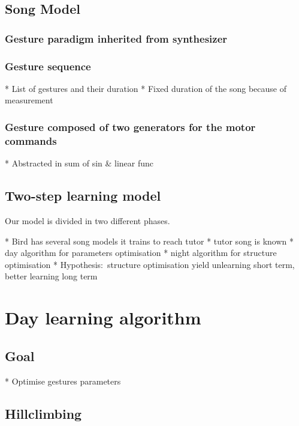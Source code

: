 \documentclass{report}
\begin{document}
\subsection{Song Model}\label{song-model}



\subsubsection{Gesture paradigm inherited from
synthesizer}\label{gesture-paradigm-inherited-from-synthesizer}

\subsubsection{Gesture sequence}\label{song-structure}

  * List of gestures and their duration
  * Fixed duration of the song because of measurement

\subsubsection{Gesture composed of two generators for the motor
commands}\label{gesture-composed-of-two-generators-for-the-motor-commands}

  * Abstracted in sum of sin \& linear func

\subsection{Two-step learning model} \label{two-step-learning-model}

Our model is divided in two different phases.

  * Bird has several song models it trains to reach tutor
  * tutor song is known
  * day algorithm for parameters optimisation
  * night algorithm for structure optimisation
  * Hypothesis:~structure optimisation yield unlearning short term, better
  learning long term


\section{Day learning algorithm}\label{day-learning-algorithm}

\subsection{Goal}\label{goal}
  * Optimise gestures parameters
\subsection{Hillclimbing}\label{hillclimbing}
\end{document}
